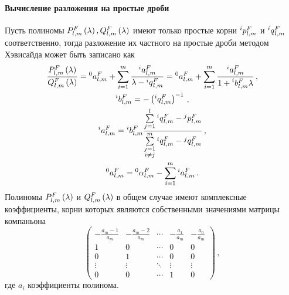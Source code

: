 \documentclass[../document.tex]{subfiles}
\begin{document}
                \paragraph{Вычисление разложения на простые дроби}
                    \par Пусть полиномы $P_{l,m}^F\left(\lambda\right),Q_{l,m}^F\left(\lambda\right)$ имеют только простые корни $\prescript{i}{}{p}_{l,m}^F$ и $\prescript{i}{}{q}_{l,m}^F$ соответственно, тогда разложение их частного на простые дроби методом Хэвисайда \cite{heavyside} может быть записано как
                    \begin{equation}
                        \begin{gathered}
                            \frac{P_{l,m}^F\left(\lambda\right)}{Q_{l,m}^F\left(\lambda\right)}=\prescript{0}{}{a}_{l,m}^F+\sum\limits_{i=1}^m\frac{\prescript{i}{}{a}_{l,m}^F}{\lambda-\prescript{i}{}{q}_{l,m}^F}=\prescript{0}{}{a}_{l,m}^F+\sum\limits_{i=1}^m\frac{\prescript{i}{}{a}_{l,m}^F}{1+\prescript{i}{}{b}_{l,m}^F\lambda}\,,\\
                            \prescript{i}{}{b}_{l,m}^F=-\left(\prescript{i}{}{q}_{l,m}^F\right)^{-1}\,,\\
                            \prescript{i}{}{a}_{l,m}^F=\prescript{i}{}{b}_{l,m}^F\frac{\sum\limits_{j=1}^l\prescript{i}{}{q}_{l,m}^F-\prescript{j}{}{p}_{l,m}^F}{\sum\limits_{\substack{j=1\\i\ne j}}^m\prescript{i}{}{q}_{l,m}^F-\prescript{j}{}{q}_{l,m}^F}\,,\\
                            \prescript{0}{}{a}_{l,m}^F=\prescript{0}{}{\alpha}_{l,m}^F-\sum\limits_{i=1}^m\prescript{i}{}{a}_{l,m}^F\,.
                        \end{gathered}
                    \end{equation}
                    Полиномы $P_{l,m}^F\left(\lambda\right)$ и $Q_{l,m}^F\left(\lambda\right)$ в общем случае имеют комплексные коэффициенты, корни которых являются собственными значениями матрицы компаньона \cite{numerical_recipes}
                    \begin{equation}
                        \begin{pmatrix}
                            -\frac{a_m-1}{a_m} & -\frac{a_m-2}{a_m} & \cdots & -\frac{a_1}{a_m} & -\frac{a_0}{a_m}\\
                            1 & 0 & \cdots & 0 & 0\\
                            0 & 1 & \cdots & 0 & 0\\
                            \vdots & \vdots & \ddots & \vdots & \vdots\\
                            0 & 0 & \cdots & 1 & 0
                        \end{pmatrix}\,,
                    \end{equation}
                    где $a_i$ коэффициенты полинома.
\end{document}
